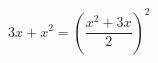 \begin{ex}[type=equation]
	\begin{condition}
		$3x + x^2 = \left(\dfrac{x^2 + 3x}{2}\right)^2$
	\end{condition}
\end{ex}